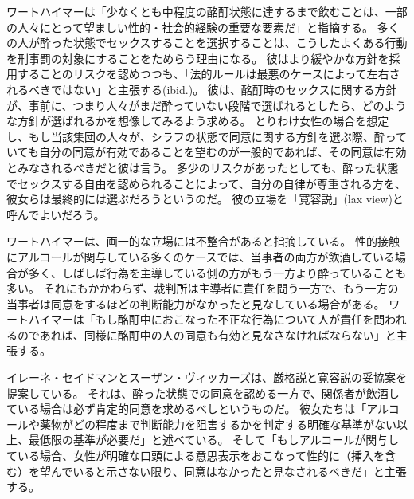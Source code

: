 \documentclass[paper=a4,book,openany]{jlreq}
\begin{document}
ワートハイマーは「少なくとも中程度の酩酊状態に達するまで飲むことは、一部の人々にとって望ましい性的・社会的経験の重要な要素だ」と指摘する\citep[p.251]{wertheimer03:_consen_sexual_relat}。
多くの人が酔った状態でセックスすることを選択することは、こうしたよくある行動を刑事罰の対象にすることをためらう理由になる。
彼はより緩やかな方針を採用することのリスクを認めつつも、「法的ルールは最悪のケースによって左右されるべきではない」と主張する(ibid.)。
彼は、酩酊時のセックスに関する方針が、事前に、つまり人々がまだ酔っていない段階で選ばれるとしたら、どのような方針が選ばれるかを想像してみるよう求める。
とりわけ女性の場合を想定し、もし当該集団の人々が、シラフの状態で同意に関する方針を選ぶ際、酔っていても自分の同意が有効であることを望むのが一般的であれば、その同意は有効とみなされるべきだと彼は言う。
多少のリスクがあったとしても、酔った状態でセックスする自由を認められることによって、自分の自律が尊重される方を、彼女らは最終的には選ぶだろうというのだ。
彼の立場を「寛容説」(lax view)と呼んでよいだろう。

ワートハイマーは、画一的な立場には不整合があると指摘している。
性的接触にアルコールが関与している多くのケースでは、当事者の両方が飲酒している場合が多く、しばしば行為を主導している側の方がもう一方より酔っていることも多い。
それにもかかわらず、裁判所は主導者に責任を問う一方で、もう一方の当事者は同意をするほどの判断能力がなかったと見なしている場合がある。
ワートハイマーは「もし酩酊中におこなった不正な行為について人が責任を問われるのであれば、同様に酩酊中の人の同意も有効と見なさなければならない」と主張する\citep[p.233]{wertheimer03:_consen_sexual_relat}。

イレーネ・セイドマンとスーザン・ヴィッカーズは、厳格説と寛容説の妥協案を提案している。
それは、酔った状態での同意を認める一方で、関係者が飲酒している場合は必ず肯定的同意を求めるべしというものだ。
彼女たちは「アルコールや薬物がどの程度まで判断能力を阻害するかを判定する明確な基準がない以上、最低限の基準が必要だ」と述べている。
そして「もしアルコールが関与している場合、女性が明確な口頭による意思表示をおこなって性的に（挿入を含む）を望んでいると示さない限り、同意はなかったと見なされるべきだ」と主張する\citep[p.486]{seidman05:_secon_wave}。
\end{document}
